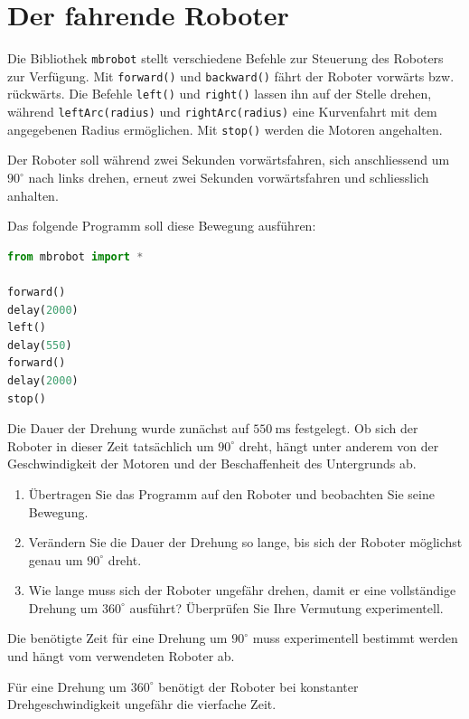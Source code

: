 \section{Der fahrende Roboter}

Die Bibliothek \texttt{mbrobot} stellt verschiedene Befehle
zur Steuerung des Roboters zur Verfügung. Mit
\texttt{forward()} und \texttt{backward()} fährt der Roboter
vorwärts bzw. rückwärts. Die Befehle \texttt{left()} und
\texttt{right()} lassen ihn auf der Stelle drehen, während
\texttt{leftArc(radius)} und \texttt{rightArc(radius)}
eine Kurvenfahrt mit dem angegebenen Radius ermöglichen.
Mit \texttt{stop()} werden die Motoren angehalten.



\begin{myexercise}

    Der Roboter soll während zwei Sekunden vorwärtsfahren,
    sich anschliessend um \(90^\circ\) nach links drehen,
    erneut zwei Sekunden vorwärtsfahren und schliesslich
    anhalten.

    Das folgende Programm soll diese Bewegung ausführen:

    \begin{lstlisting}[language=Python]
from mbrobot import *

forward()
delay(2000)
left()
delay(550)
forward()
delay(2000)
stop()
    \end{lstlisting}

    Die Dauer der Drehung wurde zunächst auf
    \(\SI{550}{\milli\second}\) festgelegt. Ob sich der
    Roboter in dieser Zeit tatsächlich um \(90^\circ\)
    dreht, hängt unter anderem von der Geschwindigkeit
    der Motoren und der Beschaffenheit des Untergrunds ab.

    \begin{enumerate}
        \item Übertragen Sie das Programm auf den Roboter
              und beobachten Sie seine Bewegung.

        \item Verändern Sie die Dauer der Drehung so lange,
              bis sich der Roboter möglichst genau um
              \(90^\circ\) dreht.

        \item Wie lange muss sich der Roboter ungefähr
              drehen, damit er eine vollständige
              Drehung um \(360^\circ\) ausführt?
              Überprüfen Sie Ihre Vermutung experimentell.
    \end{enumerate}

    \begin{myanswer}
        Die benötigte Zeit für eine Drehung um \(90^\circ\)
        muss experimentell bestimmt werden und hängt
        vom verwendeten Roboter ab.

        Für eine Drehung um \(360^\circ\) benötigt der
        Roboter bei konstanter Drehgeschwindigkeit
        ungefähr die vierfache Zeit.
    \end{myanswer}
\end{myexercise}


